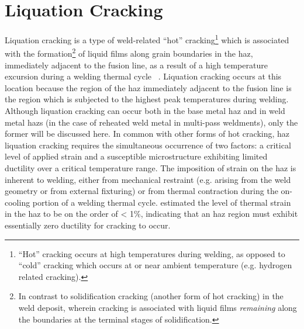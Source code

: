 
\section{Liquation Cracking} \label{sec:liquation-cracking}
Liquation cracking is a type of weld-related “hot” cracking\footnote{“Hot” cracking occurs at high temperatures during welding, as opposed to “cold” cracking which occurs at or near ambient temperature (e.g. hydrogen related cracking).} which is associated with the formation\footnote{In contrast to solidification cracking (another form of hot cracking) in the weld deposit, wherein cracking is associated with liquid films \emph{remaining} along the boundaries at the terminal stages of solidification.} of liquid films along grain boundaries in the \gls{haz}, immediately adjacent to the fusion line, as a result of a high temperature excursion during a welding thermal cycle ~\cite{lippold_welding_2014}. Liquation cracking occurs at this location because the region of the \gls{haz} immediately adjacent to the fusion line is the region which is subjected to the highest peak temperatures during welding. Although liquation cracking can occur both in the base metal \gls{haz} and in weld metal \gls{haz}s (in the case of reheated weld metal in multi-pass weldments), only the former will be discussed here. In common with other forms of hot cracking, \gls{haz} liquation cracking requires the simultaneous occurrence of two factors: a critical level of applied strain and a susceptible microstructure exhibiting limited ductility over a critical temperature range. The imposition of strain on the \gls{haz} is inherent to welding, either from mechanical restraint (e.g. arising from the weld geometry or from external fixturing) or from thermal contraction during the on-cooling portion of a welding thermal cycle. \citet{yeniscavich_correlation_1970} estimated the level of thermal strain in the \gls{haz} to be on the order of < 1\%, indicating that an \gls{haz} region must exhibit essentially zero ductility for cracking to occur. 


